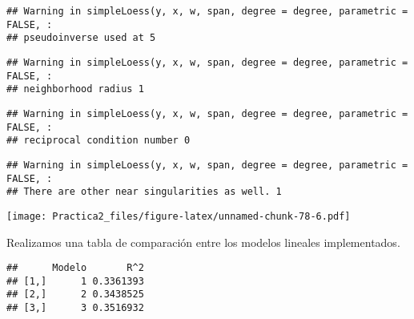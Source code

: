 \documentclass[
]{article}
\newenvironment{Shaded}{\begin{snugshade}}{\end{snugshade}}
\newcommand{\AttributeTok}[1]{\textcolor[rgb]{0.77,0.63,0.00}{#1}}
\newcommand{\CommentTok}[1]{\textcolor[rgb]{0.56,0.35,0.01}{\textit{#1}}}
\newcommand{\ConstantTok}[1]{\textcolor[rgb]{0.00,0.00,0.00}{#1}}
\newcommand{\DecValTok}[1]{\textcolor[rgb]{0.00,0.00,0.81}{#1}}
\newcommand{\FunctionTok}[1]{\textcolor[rgb]{0.00,0.00,0.00}{#1}}
\newcommand{\NormalTok}[1]{#1}
\newcommand{\OtherTok}[1]{\textcolor[rgb]{0.56,0.35,0.01}{#1}}
\newcommand{\SpecialCharTok}[1]{\textcolor[rgb]{0.00,0.00,0.00}{#1}}
\newcommand{\StringTok}[1]{\textcolor[rgb]{0.31,0.60,0.02}{#1}}
\begin{document}
\begin{verbatim}
## Warning in simpleLoess(y, x, w, span, degree = degree, parametric = FALSE, :
## pseudoinverse used at 5
\end{verbatim}

\begin{verbatim}
## Warning in simpleLoess(y, x, w, span, degree = degree, parametric = FALSE, :
## neighborhood radius 1
\end{verbatim}

\begin{verbatim}
## Warning in simpleLoess(y, x, w, span, degree = degree, parametric = FALSE, :
## reciprocal condition number 0
\end{verbatim}

\begin{verbatim}
## Warning in simpleLoess(y, x, w, span, degree = degree, parametric = FALSE, :
## There are other near singularities as well. 1
\end{verbatim}

\texttt{[image: Practica2\_files/figure-latex/unnamed-chunk-78-6.pdf]}

Realizamos una tabla de comparación entre los modelos lineales
implementados.

\begin{Shaded}
\end{Shaded}

\begin{verbatim}
##      Modelo       R^2
## [1,]      1 0.3361393
## [2,]      2 0.3438525
## [3,]      3 0.3516932
\end{verbatim}
\end{document}
